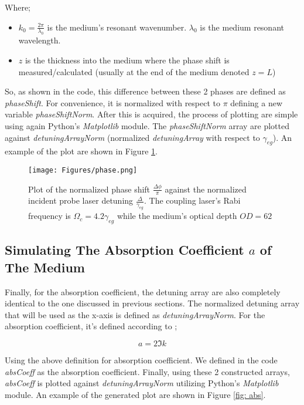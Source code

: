 Where;

\begin{itemize}
    \item $k_{0} = \frac{2\pi}{\lambda_{0}}$ is the medium's resonant wavenumber. $\lambda_{0}$ is the medium resonant wavelength.
    \item $z$ is the thickness into the medium where the phase shift is measured/calculated (usually at the end of the medium denoted $z = L$)
\end{itemize}

So, as shown in the code, this difference between these 2 phases are defined as \textit{phaseShift}. For convenience, it is normalized with respect to $\pi$ defining a new variable \textit{phaseShiftNorm}. After this is acquired, the process of plotting are simple using again Python's \textit{Matplotlib} module. The \textit{phaseShiftNorm} array are plotted against \textit{detuningArrayNorm} (normalized \textit{detuningArray} with respect to $\gamma_{eg}$). An example of the plot are shown in Figure \ref{fig: phase}.

\begin{figure}
    \centering
    \texttt{[image: Figures/phase.png]}
    \caption[Plot of The Phase Shift Between The Transmitted Field and The Incident Field As A Function of Incident Probe Laser Detuning]{Plot of the normalized phase shift $\frac{\Delta\phi}{\pi}$ against the normalized incident probe laser detuning $\frac{\Delta}{\gamma_{eg}}$. The coupling laser's Rabi frequency is $\Omega_{c} = 4.2\gamma_{eg}$ while the medium's optical depth $OD = 62$}
    \label{fig: phase}
\end{figure}

\subsection{Simulating The Absorption Coefficient $a$ of The Medium}
Finally, for the absorption coefficient, the detuning array are also completely identical to the one discussed in previous sections. The normalized detuning array that will be used as the x-axis is defined as \textit{detuningArrayNorm}. For the absorption coefficient, it's defined according to ;

\begin{equation}
    a = 2 \Im{k}
\end{equation}

Using the above definition for absorption coefficient. We defined in the code \textit{absCoeff} as the absorption coefficient. Finally, using these 2 constructed arrays, \textit{absCoeff} is plotted against \textit{detuningArrayNorm} utilizing Python's \textit{Matplotlib} module. An example of the generated plot are shown in Figure \ref{fig: abs}.

